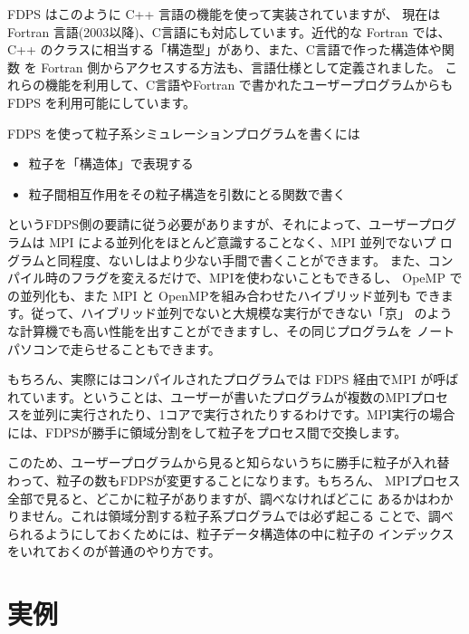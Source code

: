 \documentclass{jspf}            %
\begin{document}
FDPS はこのように C++ 言語の機能を使って実装されていますが、
現在はFortran 言語(2003以降)、C言語にも対応しています。近代的な Fortran では、
C++ のクラスに相当する「構造型」があり、また、C言語で作った構造体や関数
を Fortran 側からアクセスする方法も、言語仕様として定義されました。
これらの機能を利用して、C言語やFortran で書かれたユーザープログラムからも
FDPS を利用可能にしています。

FDPS を使って粒子系シミュレーションプログラムを書くには

\begin{itemize}

\item 粒子を「構造体」で表現する
\item 粒子間相互作用をその粒子構造を引数にとる関数で書く
\end{itemize}

というFDPS側の要請に従う必要がありますが、それによって、ユーザープログ
ラムは MPI による並列化をほとんど意識することなく、MPI 並列でないプ
ログラムと同程度、ないしはより少ない手間で書くことができます。
また、コンパイル時のフラグを変えるだけで、MPIを使わないこともできるし、
OpeMP での並列化も、また MPI と OpenMPを組み合わせたハイブリッド並列も
できます。従って、ハイブリッド並列でないと大規模な実行ができない「京」
のような計算機でも高い性能を出すことができますし、その同じプログラムを
ノートパソコンで走らせることもできます。


もちろん、実際にはコンパイルされたプログラムでは FDPS 経由でMPI が呼ば
れています。ということは、ユーザーが書いたプログラムが複数のMPIプロセ
スを並列に実行されたり、1コアで実行されたりするわけです。MPI実行の場合
には、FDPSが勝手に領域分割をして粒子をプロセス間で交換します。

このため、ユーザープログラムから見ると知らないうちに勝手に粒子が入れ替
わって、粒子の数もFDPSが変更することになります。もちろん、
MPIプロセス全部で見ると、どこかに粒子がありますが、調べなければどこに
あるかはわかりません。これは領域分割する粒子系プログラムでは必ず起こる
ことで、調べられるようにしておくためには、粒子データ構造体の中に粒子の
インデックスをいれておくのが普通のやり方です。

\section{実例}%
\end{document}
